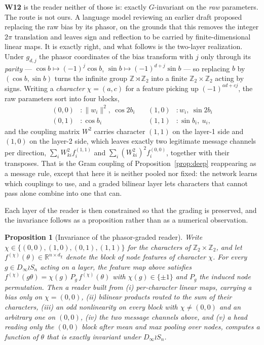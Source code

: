 \documentclass[10pt,twocolumn,letterpaper]{article}
\newtheorem{proposition}[theorem]{Proposition}
\theoremstyle{definition}
\newcommand{\R}{\mathbb{R}}
\newcommand{\Z}{\mathbb{Z}}
\newcommand{\Dinf}{D_\infty}
\begin{document}
\textbf{W12} is the reader neither of those is: exactly $G$-invariant on the \emph{raw} parameters.
The route is not ours. A language model reviewing an earlier draft proposed replacing the raw bias by its
phasor, on the grounds that this removes the integer $2\pi$ translation and leaves sign and
reflection to be carried by finite-dimensional linear maps. It is exactly right, and what follows is
the two-layer realization. Under $g_{d,j}$ the phasor coordinates of the bias transform with $j$
only through its \emph{parity} --- $\cos b \mapsto (-1)^j \cos b$, $\sin b \mapsto (-1)^{d+j}\sin b$ --- so replacing
$b$ by $(\cos b, \sin b)$ turns the infinite group $\Z\rtimes\Z_2$ into a finite $\Z_2\times\Z_2$
acting by signs. Writing a \emph{character} $\chi=(a,c)$ for a feature picking up $(-1)^{ad+cj}$,
the raw parameters sort into four blocks,
\[
\begin{aligned}
(0,0)&\!: \|w_i\|^2,\ \cos 2b_i &\quad (1,0)&\!: w_i,\ \sin 2b_i\\
(0,1)&\!: \cos b_i &\quad (1,1)&\!: \sin b_i,\ u_i ,
\end{aligned}
\]
and the coupling matrix $W^2$ carries character $(1,1)$ on the layer-1 side and $(1,0)$ on the
layer-2 side, which leaves exactly two legitimate message channels per direction,
$\sum_i W^2_{ki} f_i^{(1,1)}$ and $\sum_i (W^2_{ki})^2 f_i^{(0,0)}$, together with their transposes.
That is the Gram coupling of Proposition~\ref{prop:deep} reappearing as a message rule, except that
here it is neither pooled nor fixed: the network learns which couplings to use, and a graded
bilinear layer lets characters that cannot pass alone combine into one that can.

Each layer of the reader is then constrained so that the grading is preserved, and the invariance
follows as a proposition rather than as a numerical observation.

\begin{proposition}[Invariance of the phasor-graded reader]\label{prop:w12}
Write $\chi \in \{(0,0),(1,0),(0,1),(1,1)\}$ for the characters of $\Z_2 \times \Z_2$, and let
$f^{(\chi)}(\theta) \in \R^{n \times d_\chi}$ denote the block of node features of character
$\chi$. For every $g \in \Dinf \wr S_n$ acting on a layer, the feature map above satisfies
$f^{(\chi)}(g\theta) = \chi(g)\, P_g\, f^{(\chi)}(\theta)$ with $\chi(g) \in \{\pm1\}$ and
$P_g$ the induced node permutation. Then a reader built from \emph{(i)} per-character linear maps,
carrying a bias only on $\chi = (0,0)$, \emph{(ii)} bilinear products routed to the sum of their
characters, \emph{(iii)} an \emph{odd} nonlinearity on every block with $\chi \ne (0,0)$ and an
arbitrary one on $(0,0)$, \emph{(iv)} the two message channels above, and \emph{(v)} a head reading
only the $(0,0)$ block after mean and max pooling over nodes, computes a function of $\theta$ that
is exactly invariant under $\Dinf \wr S_n$.
\end{proposition}
\end{document}
